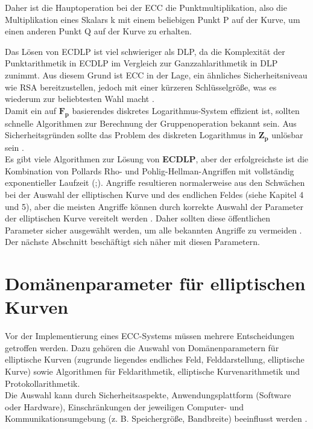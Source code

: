 Daher ist die Hauptoperation bei der ECC die Punktmultiplikation, also die Multiplikation eines Skalars k mit einem beliebigen Punkt P auf der Kurve, um einen anderen Punkt Q auf der Kurve zu erhalten. 

Das Lösen von ECDLP ist viel schwieriger als DLP, da die Komplexität der Punktarithmetik in ECDLP im Vergleich zur Ganzzahlarithmetik in DLP zunimmt. 
Aus diesem Grund ist ECC in der Lage, ein ähnliches Sicherheitsniveau wie RSA bereitzustellen, jedoch mit einer kürzeren Schlüsselgröße, was es wiederum zur beliebtesten Wahl macht \cite{mo2014}.\\ 

Damit ein auf $ \mathbf{F_p} $ basierendes diskretes Logarithmus-System effizient ist, sollten schnelle Algorithmen zur Berechnung der Gruppenoperation bekannt sein. Aus Sicherheitsgründen sollte das Problem des diskreten Logarithmus in $ \mathbf{Z_p} $ unlösbar sein \cite{Hankerson}. \\
Es gibt viele Algorithmen zur Lösung von \textbf{ECDLP}, aber der erfolgreichste ist die Kombination von Pollards Rho- und Pohlig-Hellman-Angriffen mit vollständig exponentieller Laufzeit (\cite{mo2014};\cite{Hankerson}). 
Angriffe resultieren normalerweise aus den Schwächen bei der Auswahl der elliptischen Kurve und des endlichen Feldes (siehe Kapitel 4 und 5), aber die meisten Angriffe können durch korrekte Auswahl der Parameter der elliptischen Kurve vereitelt werden \cite{mo2014}.
Daher sollten diese öffentlichen Parameter sicher ausgewählt werden, um alle bekannten Angriffe zu vermeiden \cite{aliKa}. Der nächste Abschnitt beschäftigt sich näher mit diesen Parametern. 

\section{Domänenparameter für elliptischen Kurven}

Vor der Implementierung eines ECC-Systems müssen mehrere Entscheidungen getroffen werden.
Dazu gehören die Auswahl von Domänenparametern für elliptische Kurven (zugrunde liegendes endliches Feld, Felddarstellung, elliptische Kurve) sowie Algorithmen für Feldarithmetik, elliptische Kurvenarithmetik und Protokollarithmetik.\\

Die Auswahl kann durch Sicherheitsaspekte, Anwendungsplattform (Software oder Hardware), Einschränkungen der jeweiligen Computer- und Kommunikationsumgebung (z. B. Speichergröße, Bandbreite) beeinflusst werden \cite{Havaze}.\\

